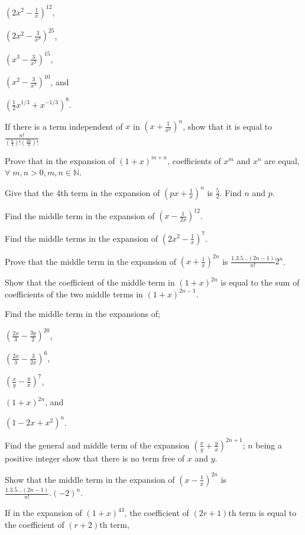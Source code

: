   \item $\left(2x^2 - \frac{1}{x}\right)^{12}$,
  \item $\left(2x^2 - \frac{3}{x^3}\right)^{25}$,
  \item $\left(x^3 - \frac{3}{x^2}\right)^{15}$,
  \item $\left(x^2 - \frac{3}{x^3}\right)^{10}$, and
  \item $\left(\frac{1}{2}x^{1/3} + x^{-1/3}\right)^8$.
  \stopitemize
\item If there is a term independent of $x$ in $\left(x + \frac{1}{x^2}\right)^n$, show that it is equal to
  $\frac{n!}{\left(\frac{n}{3}\right)!\left(\frac{2n}{3}\right)!}$
\item Prove that in the expansion of $(1 + x)^{m + n}$, coefficients of $x^m$ and $x^n$ are equal, $\forall\;m,n > 0,m,
  n\in\mathbb{N}$.
\item Give that the $4$th term in the expansion of $\left(px + \frac{1}{x}\right)^n$ is $\frac{5}{2}$. Find $n$ and $p$.
\item Find the middle term in the expansion of $\left(x - \frac{1}{2x}\right)^{12}$.
\item Find the middle terms in the expansion of $\left(2x^2 - \frac{1}{x}\right)^7$.
\item Prove that the middle term in the expansion of $\left(x + \frac{1}{x}\right)^{2n}$ is $\frac{1.3.5\ldots(2n - 1)}{n!}2^n$.
\item Show that the coefficient of the middle term in $(1 + x)^{2n}$ is equal to the sum of coefficients of the two middle terms in
  $(1 + x)^{2n - 1}$.
\item Find the middle term in the expansions of;
  \startitemize[i]
  \item $\left(\frac{2x}{3} - \frac{3y}{2}\right)^{20}$,
  \item $\left(\frac{2x}{3} - \frac{3}{2x}\right)^6$,
  \item $\left(\frac{x}{y} - \frac{y}{x}\right)^7$,
  \item $(1 + x)^{2n}$, and
  \item $(1 - 2x + x^2)^n$.
  \stopitemize
\item Find the general and middle term of the expansion $\left(\frac{x}{y} + \frac{y}{x}\right)^{2n + 1}$; $n$ being a positive
  integer show that there is no term free of $x$ and $y$.
\item Show that the middle term in the expansion of $\left(x - \frac{1}{x}\right)^{2n}$ is $\frac{1.3.5\ldots (2n -1)}{n!}.(-2)^n$.
\item If in the expansion of $(1 + x)^{43}$, the coefficient of $(2r + 1)$th term is equal to the coefficient of $(r + 2)$th term,
